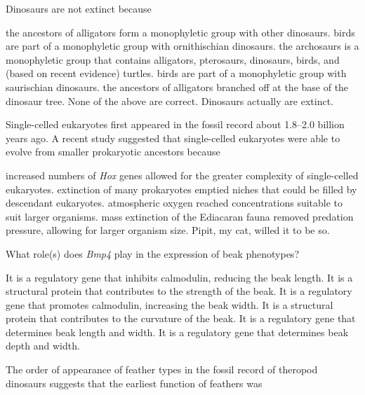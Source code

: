 \question
Dinosaurs are not extinct because 

\begin{choices}
\choice the ancestors of alligators form a monophyletic group with other dinosaurs. 
\choice birds are part of a monophyletic group with ornithischian dinosaurs. 
\choice the archosaurs is a monophyletic group that contains alligators, pterosaurs, dinosaurs, birds, and (based on recent evidence) turtles.   
\correctchoice birds are part of a monophyletic group with saurischian dinosaurs. 
\choice the ancestors of alligators branched off at the base of the dinosaur tree. 
\choice None of the above are correct. Dinosaurs actually are extinct.%
\end{choices}

\question
Single-celled eukaryotes first appeared in the fossil record about 1.8--2.0 billion years ago. A recent study suggested that single-celled eukaryotes were able to evolve from smaller prokaryotic ancestors because

\begin{choices}
\choice increased numbers of \textit{Hox} genes allowed for the greater complexity of single-celled eukaryotes. 
\choice extinction of many prokaryotes emptied niches that could be filled by descendant eukaryotes. 
\correctchoice atmospheric oxygen reached concentrations suitable to suit larger organisms. 
\choice mass extinction of the Ediacaran fauna removed predation pressure, allowing for larger organism size. 
\choice Pipit, my cat, willed it to be so.%
\end{choices}

\question
What role(s) does \textit{Bmp4} play in the expression of beak phenotypes?

\begin{choices}
\choice It is a regulatory gene that inhibits calmodulin, reducing the beak length. 
\choice It is a structural protein that contributes to the strength of the beak.
\choice It is a regulatory gene that promotes calmodulin, increasing the beak width. 
\choice It is a structural protein that contributes to the curvature of the beak. 
\choice It is a regulatory gene that determines beak length and width. 
\correctchoice  It is a regulatory gene that determines beak depth and width. 
\end{choices}

\question
The order of appearance of feather types in the fossil record of theropod dinosaurs suggests that the earliest function of feathers was

